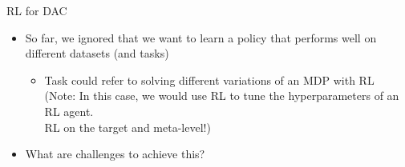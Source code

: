 	
\begin{frame}[c]{RL for DAC}
	
	\centering
    
    \bigskip
	
	\begin{itemize}
	    \item So far, we ignored that we want to learn a policy that performs well on different datasets (and tasks)
	    \begin{itemize}
	        \item Task could refer to solving different variations of an MDP with RL\\
	        (Note: In this case, we would use RL to tune the hyperparameters of an RL agent.\\ RL on the target and meta-level!)
	    \end{itemize}
	    \item What are challenges to achieve this?
	\end{itemize}	
	
\end{frame}
